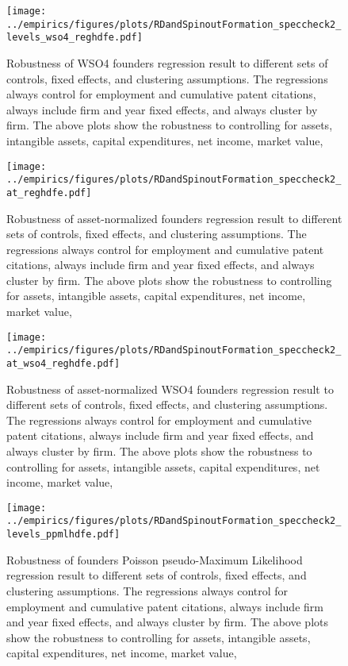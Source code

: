 \documentclass[11pt,english]{article}
\begin{document}
\begin{figure}[!htb]
	\centering
	\texttt{[image: ../empirics/figures/plots/RDandSpinoutFormation\_speccheck2\_levels\_wso4\_reghdfe.pdf]}
	\caption{Robustness of WSO4 founders regression result to different sets of controls, fixed effects, and clustering assumptions. The regressions always control for employment and cumulative patent citations, always include firm and year fixed effects, and always cluster by firm. The above plots show the robustness to controlling for assets, intangible assets, capital expenditures, net income, market value, }
	\label{figure:speccheck2_levels_wso4_reghdfe}
\end{figure}

\begin{figure}[!htb]
	\centering
	\texttt{[image: ../empirics/figures/plots/RDandSpinoutFormation\_speccheck2\_at\_reghdfe.pdf]}
	\caption{Robustness of asset-normalized founders regression result to different sets of controls, fixed effects, and clustering assumptions. The regressions always control for employment and cumulative patent citations, always include firm and year fixed effects, and always cluster by firm. The above plots show the robustness to controlling for assets, intangible assets, capital expenditures, net income, market value, }
	\label{figure:speccheck2_at_reghdfe}
\end{figure}

\begin{figure}[!htb]
	\centering
	\texttt{[image: ../empirics/figures/plots/RDandSpinoutFormation\_speccheck2\_at\_wso4\_reghdfe.pdf]}
	\caption{Robustness of asset-normalized WSO4 founders regression result to different sets of controls, fixed effects, and clustering assumptions. The regressions always control for employment and cumulative patent citations, always include firm and year fixed effects, and always cluster by firm. The above plots show the robustness to controlling for assets, intangible assets, capital expenditures, net income, market value, }
	\label{figure:speccheck2_at_wso4_reghdfe}
\end{figure}

\begin{figure}[!htb]
	\centering
	\texttt{[image: ../empirics/figures/plots/RDandSpinoutFormation\_speccheck2\_levels\_ppmlhdfe.pdf]}
	\caption{Robustness of founders Poisson pseudo-Maximum Likelihood regression result to different sets of controls, fixed effects, and clustering assumptions. The regressions always control for employment and cumulative patent citations, always include firm and year fixed effects, and always cluster by firm. The above plots show the robustness to controlling for assets, intangible assets, capital expenditures, net income, market value, }
	\label{figure:speccheck2_levels_ppmlhdfe}
\end{figure}
\end{document}
